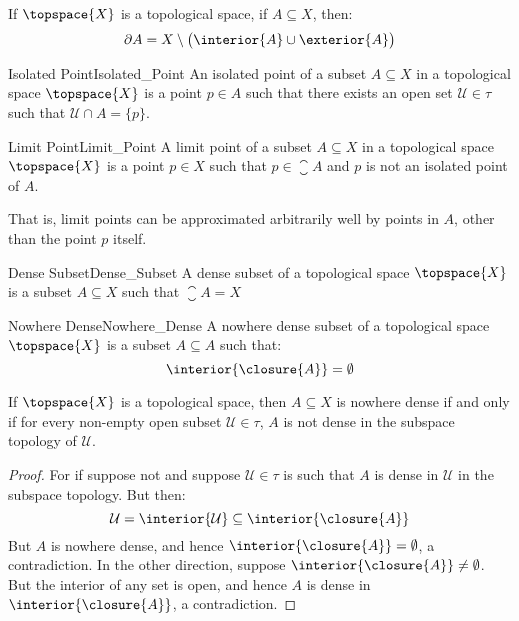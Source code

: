         \begin{theorem}
            If $\topspace{X}$ is a topological space, if $A\subseteq{X}$,
            then:
            \begin{equation}
                \partial{A}=X\setminus\big(\interior{A}\cup\exterior{A}\big)
            \end{equation}
        \end{theorem}
        \begin{fdefinition}{Isolated Point}{Isolated_Point}
            An isolated point of a subset $A\subseteq{X}$ in a topological
            space $\topspace{X}$ is a point $p\in{A}$ such that there exists
            an open set $\mathcal{U}\in\tau$ such that
            $\mathcal{U}\cap{A}=\{p\}$.
        \end{fdefinition}
        \begin{fdefinition}{Limit Point}{Limit_Point}
            A limit point of a subset $A\subseteq{X}$ in a topological space
            $\topspace{X}$ is a point $p\in{X}$ such that
            $p\in\closure{A}$ and $p$ is not an isolated point of $A$.
        \end{fdefinition}
        That is, limit points can be approximated arbitrarily well by points
        in $A$, other than the point $p$ itself.
        \begin{fdefinition}{Dense Subset}{Dense_Subset}
            A dense subset of a topological space $\topspace{X}$ is a subset
            $A\subseteq{X}$ such that $\closure{A}=X$
        \end{fdefinition}
        \begin{fdefinition}{Nowhere Dense}{Nowhere_Dense}
            A nowhere dense subset of a topological space $\topspace{X}$ is
            a subset $A\subseteq{A}$ such that:
            \begin{equation*}
                \interior{\closure{A}}=\emptyset
            \end{equation*}
        \end{fdefinition}
        \begin{theorem}
            If $\topspace{X}$ is a topological space, then $A\subseteq{X}$
            is nowhere dense if and only if for every non-empty open subset
            $\mathcal{U}\in\tau$, $A$ is not dense in the subspace topology
            of $\mathcal{U}$.
        \end{theorem}
        \begin{proof}
            For if suppose not and suppose $\mathcal{U}\in\tau$ is such that
            $A$ is dense in $\mathcal{U}$ in the subspace topology. But
            then:
            \begin{equation}
                \mathcal{U}=\interior{\mathcal{U}}
                    \subseteq\interior{\closure{A}}
            \end{equation}
            But $A$ is nowhere dense, and hence
            $\interior{\closure{A}}=\emptyset$, a contradiction. In the
            other direction, suppose $\interior{\closure{A}}\ne\emptyset$.
            But the interior of any set is open, and hence $A$ is dense in
            $\interior{\closure{A}}$, a contradiction.
        \end{proof}
